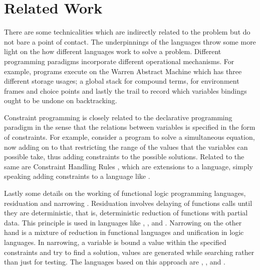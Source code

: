 \documentclass[proposal.tex]{subfiles}
\begin{document}
\chapter{Related Work}\label{chap:relatedWork}


 There are some technicalities which are indirectly related to the problem but do not bare a point of contact. The underpinnings of the languages throw some more light on the how different languages work to solve a problem. Different programming paradigms incorporate different operational mechanisms. For example,  programs execute on the Warren Abstract Machine \cite{ait1999warren} which has three different storage usages; a global stack for compound terms, for environment frames and choice points and lastly the trail to record which variables bindings ought to be undone on backtracking.        

\par Constraint programming \cite{website:constraintprogwiki} is closely related to the declarative programming paradigm in the sense that the relations between variables is specified in the form of constraints. For example, consider a program to solve a simultaneous equation, now adding on to that restricting the range of the values that the variables can possible take, thus adding constraints to the possible solutions. Related to the same are Constraint Handling Rules \cite{website:chrwiki}, which are extensions to a language, simply speaking adding constraints to a language like .  

\par Lastly some details on the working of functional logic programming languages, residuation and narrowing \cite{hanus1995curry,webiste:wikicurry}. Residuation involves delaying of functions calls until they are deterministic, that is, deterministic reduction of functions with partial data. This principle is used in languages like  \cite{lloyd1999programming:escher},  \cite{website:life},  
\cite{website:nue-prolog} and  \cite{website:oz-mozart}. Narrowing on the other hand is a mixture of reduction in functional languages and unification in logic languages. In narrowing, a variable is bound a value within the specified constraints and try to find a solution, values are generated while searching rather than just for testing. The languages based on this approach are  \cite{website:alf},  \cite{website:babel},  \cite{bert1987lpg} and  \cite{website:curry}.   
\end{document}
